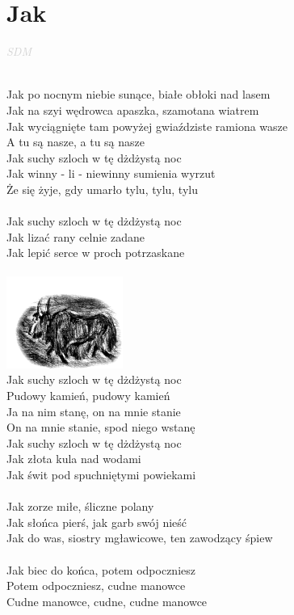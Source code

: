 \documentclass[a5paper, 10pt]{book}
\begin{document}
\section{Jak}\textcolor{lightgray}{\textit{SDM}}\\~\\
\begin{minipage}[t]{0.75\textwidth}
Jak po nocnym niebie sunące, białe obłoki nad lasem\\
Jak na szyi wędrowca apaszka, szamotana wiatrem\\
Jak wyciągnięte tam powyżej gwiaździste ramiona wasze\\
A tu są nasze, a tu są nasze\\

Jak suchy szloch w tę dżdżystą noc\\
Jak winny - li - niewinny sumienia wyrzut\\
Że się żyje, gdy umarło tylu, tylu, tylu\\
\\
Jak suchy szloch w tę dżdżystą noc\\
Jak lizać rany celnie zadane\\
Jak lepić serce w proch potrzaskane\\
\\
\includegraphics[height=3cm,right]{images/jak.png}\vspace*{-3.05cm}\\
Jak suchy szloch w tę dżdżystą noc\\
Pudowy kamień, pudowy kamień\\
Ja na nim stanę, on na mnie stanie\\
On na mnie stanie, spod niego wstanę\\
Jak suchy szloch w tę dżdżystą noc\\
Jak złota kula nad wodami\\
Jak świt pod spuchniętymi powiekami\\
\\
Jak zorze miłe, śliczne polany\\
Jak słońca pierś, jak garb swój nieść\\
Jak do was, siostry mgławicowe, ten zawodzący śpiew\\
\\
Jak biec do końca, potem odpoczniesz\\
Potem odpoczniesz, cudne manowce\\
Cudne manowce, cudne, cudne manowce\\
\end{minipage}
\end{document}
